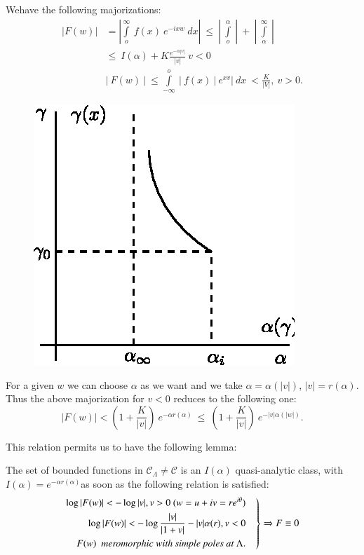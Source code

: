 We\pageoriginale have the following majorizations:
\begin{align*}
 |F(w)| &= | \int\limits_o^\infty ~ f(x) ~ e^{-ixw} ~ dx | ~ \le ~
 |~ \int\limits_o^\alpha ~ | ~ + ~ | ~ \int\limits_\alpha^\infty ~ |
 \\ 
 &\le ~ I(\alpha) + K \frac{e^{-\alpha | v |}}{| v |} ~ v < 0 \\
 &| ~ F(w) ~ | ~ \le \int\limits_{-\infty}^o ~ | ~ f(x) ~ | ~ e^{xv}
 |~ dx ~ < \frac{K}{| V |}, ~ v > 0. 
\end{align*}
\begin{figure}[H]
 \centerline{\includegraphics{vol15-figures/fig15-22.eps}}
\end{figure}

For a given $w$ we can choose $\alpha$ as we want and we take $\alpha
= \alpha (|v|)$, $| v | = r(\alpha)$. Thus the above majorization for $v
< 0$ reduces to the following one: 
$$
| F(w) | < \left(1 + \frac{K}{|v|}\right) ~ e^{-\alpha r(\alpha)} ~ \le ~ \left(1+
\frac{K}{|v|}\right) ~ e^{- | v | \alpha(|w|)}. 
$$

This relation permits us to have the following lemma:

\setcounter{lem}{0}
\begin{lem}\label{chap21:sec1:lem1}%
 The set of bounded functions in $\mathscr{C}_{\Lambda} \neq
 \mathscr{C}$ is an $I(\alpha)$ quasi-analytic class, with
 $I(\alpha) = e^{-\alpha r(\alpha)}$as soon as the following relation
 is satisfied: 
 \begin{equation*}
 \left.
 \begin{aligned}
  \log | F(w) | < - \log | v |, v > 0 ~ (w = u+iv = re^{i\theta})&
  \quad \\
  \log | F(w) | < - \log \frac{|v|}{|1+v|} - | v | \alpha (r), v <
  0\\
  F(w)~~ \text{\em meromorphic with simple poles at } \Lambda.&
 \end{aligned}
 \right \}
 \Rightarrow F \equiv 0
 \end{equation*}
\end{lem}


